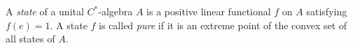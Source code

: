 A \emph{state} of a unital $C^*$-algebra $A$ is a positive linear functional $f$ on $A$ satisfying $f(e) = 1$. A state $f$ is called \emph{pure} if it is an extreme point of the convex set of all states of $A$.
